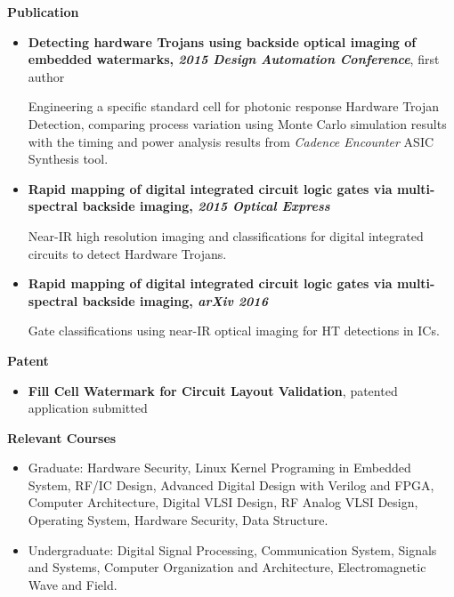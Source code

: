\documentclass[]{article}
\begin{document}
\noindent \textbf{Publication}
\begin{itemize}
    \item \textbf{Detecting hardware Trojans using backside optical imaging of
    embedded watermarks, \textit{2015 Design Automation Conference}}, first author
    
    Engineering a specific standard cell for photonic response Hardware Trojan Detection, comparing
    process variation using Monte Carlo simulation results with the timing and power analysis
    results from \textit{Cadence Encounter} ASIC Synthesis tool.

    \item \textbf{Rapid mapping of digital integrated circuit logic gates via multi-spectral backside
    imaging, \textit{2015 Optical Express}}

    Near-IR high resolution imaging and classifications for digital integrated circuits to detect
    Hardware Trojans.

	\item \textbf{Rapid mapping of digital integrated circuit logic gates via
multi-spectral backside imaging, \textit{arXiv 2016}}

	Gate classifications using near-IR optical imaging for HT detections in ICs.

\end{itemize}

\noindent \textbf{Patent}
\begin{itemize}
    \item \textbf{Fill Cell Watermark for Circuit Layout Validation}, patented application submitted
\end{itemize}

\noindent \textbf{Relevant Courses}
\begin{itemize}
\item Graduate:
                    Hardware Security, Linux Kernel Programing in Embedded System, RF/IC Design,
                    Advanced Digital Design with Verilog and FPGA, Computer
                    Architecture, Digital VLSI Design, RF Analog VLSI Design,
                    Operating System, Hardware Security, Data Structure.
\item Undergraduate:
                    Digital Signal Processing, Communication System, Signals
                    and Systems, Computer Organization and 
                    Architecture, Electromagnetic Wave and Field. 
\end{itemize}
\end{document}
